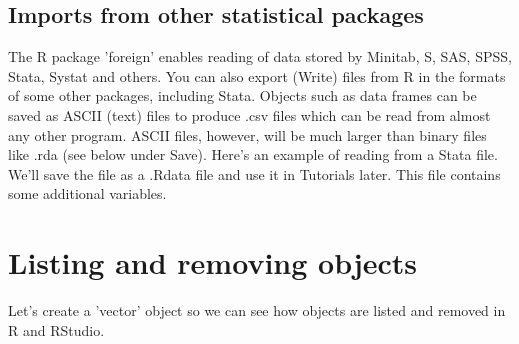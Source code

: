 \documentclass[titlepage]{book}\usepackage{knitr}
\begin{document}
\subsection{Imports from other statistical packages}
The R package 'foreign' enables reading of data stored by Minitab, S, SAS, SPSS, Stata, Systat and others. You can also export (Write) files from R in the formats of some other packages, including Stata.  Objects such as data frames can be saved as ASCII (text) files to produce .csv files which can be read from almost any other program.  ASCII files, however, will be much larger than binary files like .rda (see below under Save).  Here's an example of reading from a Stata file.  We'll save the file as a .Rdata file and use it in Tutorials later. This file contains some additional variables.

\begin{knitrout}
\color{fgcolor}\begin{kframe}
\begin{alltt}
 \hlkwb{<-} \hlstd{(}\hlstd{)}
  \hlstd{=}  \hlstd{)}
\end{alltt}
\end{kframe}
\end{knitrout}


\section{Listing and removing  objects}

Let's create a 'vector' object so we can see how objects are listed and removed in R and RStudio. 


\begin{knitrout}
\color{fgcolor}\begin{kframe}
\begin{alltt}
 \hlkwb{<-} \hlopt{$}                                
\hlstd{()}                                      
\hlstd{()}                                                 
                                            
\hlstd{()}
\end{alltt}
\end{kframe}
\end{knitrout}
\end{document}
